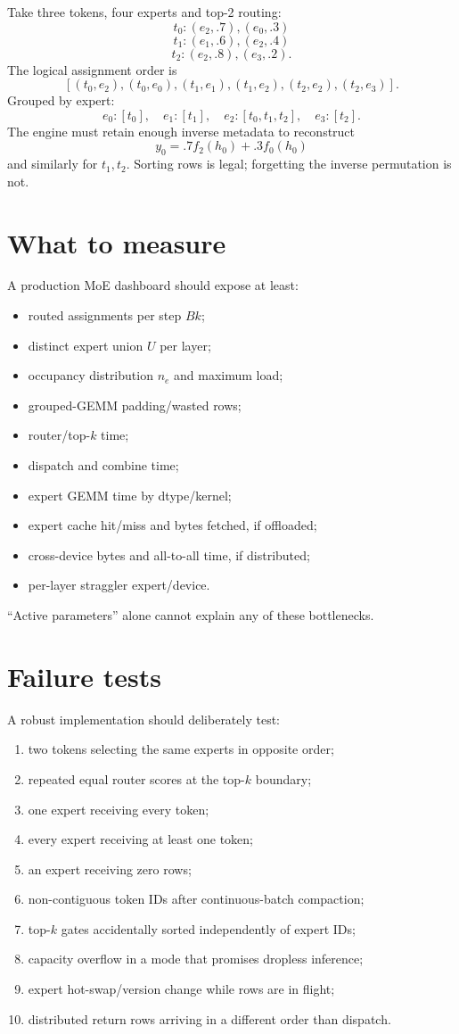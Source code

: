 Take three tokens, four experts and top-2 routing:
\[
t_0:(e_2,.7),(e_0,.3)
\]
\[
t_1:(e_1,.6),(e_2,.4)
\]
\[
t_2:(e_2,.8),(e_3,.2).
\]
The logical assignment order is
\[
[(t_0,e_2),(t_0,e_0),(t_1,e_1),(t_1,e_2),(t_2,e_2),(t_2,e_3)].
\]
Grouped by expert:
\[
e_0:[t_0],\quad
e_1:[t_1],\quad
e_2:[t_0,t_1,t_2],\quad
e_3:[t_2].
\]
The engine must retain enough inverse metadata to reconstruct
\[
y_0=.7f_2(h_0)+.3f_0(h_0)
\]
and similarly for $t_1,t_2$. Sorting rows is legal; forgetting the inverse permutation
is not.

\section{What to measure}

A production MoE dashboard should expose at least:
\begin{itemize}
\item routed assignments per step $Bk$;
\item distinct expert union $U$ per layer;
\item occupancy distribution $n_e$ and maximum load;
\item grouped-GEMM padding/wasted rows;
\item router/top-$k$ time;
\item dispatch and combine time;
\item expert GEMM time by dtype/kernel;
\item expert cache hit/miss and bytes fetched, if offloaded;
\item cross-device bytes and all-to-all time, if distributed;
\item per-layer straggler expert/device.
\end{itemize}

``Active parameters'' alone cannot explain any of these bottlenecks.

\section{Failure tests}

A robust implementation should deliberately test:
\begin{enumerate}
\item two tokens selecting the same experts in opposite order;
\item repeated equal router scores at the top-$k$ boundary;
\item one expert receiving every token;
\item every expert receiving at least one token;
\item an expert receiving zero rows;
\item non-contiguous token IDs after continuous-batch compaction;
\item top-$k$ gates accidentally sorted independently of expert IDs;
\item capacity overflow in a mode that promises dropless inference;
\item expert hot-swap/version change while rows are in flight;
\item distributed return rows arriving in a different order than dispatch.
\end{enumerate}

